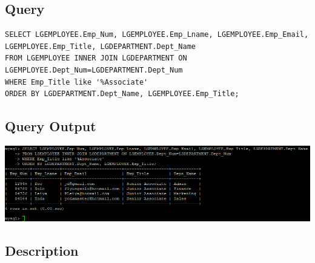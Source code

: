 \documentclass[a4paper,10pt]{article}
\begin{document}
 \subsection{Query}
          \lstset{
            language=SQL,
            breaklines=true
            }
        \begin{lstlisting}[frame=single]
        SELECT LGEMPLOYEE.Emp_Num, LGEMPLOYEE.Emp_Lname, LGEMPLOYEE.Emp_Email, LGEMPLOYEE.Emp_Title, LGDEPARTMENT.Dept_Name
FROM LGEMPLOYEE INNER JOIN LGDEPARTMENT ON LGEMPLOYEE.Dept_Num=LGDEPARTMENT.Dept_Num
WHERE Emp_Title like '%Associate'
ORDER BY LGDEPARTMENT.Dept_Name, LGEMPLOYEE.Emp_Title;

        \end{lstlisting}
\subsection{Query Output}
           \includegraphics{Queries/Question_9/Question_9_screenshot.PNG}
\subsection{Description}
\end{document}

